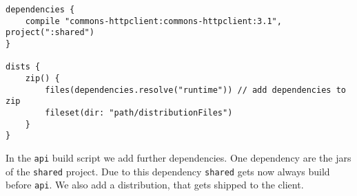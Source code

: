 \begin{Verbatim}[frame=single,label=api]
dependencies {
	compile "commons-httpclient:commons-httpclient:3.1", project(":shared")
}

dists {
	zip() {
		files(dependencies.resolve("runtime")) // add dependencies to zip
		fileset(dir: "path/distributionFiles")
	}
}
\end{Verbatim}
In the \texttt{api} build script we add further dependencies. One dependency are the jars of the \texttt{shared} project. Due to this dependency \texttt{shared} gets now always build before \texttt{api}. We also add a distribution, that gets shipped to the client.



